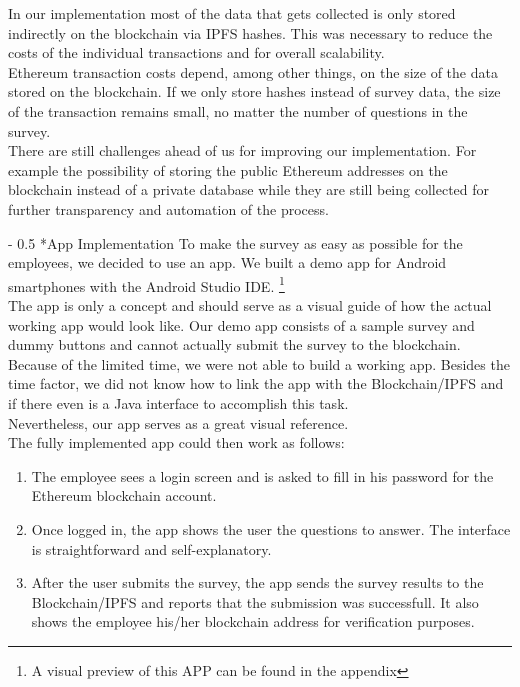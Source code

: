 \documentclass[portrait,a4paper]{article}
\makeatletter
\renewcommand\paragraph{\@startsection{paragraph}{4}{0mm}%
	{-\baselineskip}%
	{0.5\baselineskip}%
	{\normalfont\bfseries}%
}%
\makeatother
\begin{document}
			In our implementation most of the data that gets collected is only stored indirectly on the 
			blockchain via IPFS hashes. This was necessary to reduce the costs of the individual transactions 
			and for overall scalability.\\
			Ethereum transaction costs depend, among other things, on the size of the data stored on the blockchain. 
			If we only store hashes instead of survey data, the size of the transaction remains small, 
			no matter the number of questions in the survey.\\

			There are still challenges ahead of us for improving our implementation. For example the possibility of 
			storing the public Ethereum addresses on the blockchain instead of a private database while they are 
			still being collected for further transparency and automation of the process.

		\paragraph*{App Implementation}
			To make the survey as easy as possible for the employees, we decided to use an app. 
			We built a demo app for Android smartphones with the Android Studio IDE. \footnote{A visual preview
			of this APP can be found in the appendix}\\
			The app is only a concept and should serve as a visual guide of how the actual working app would look like. 
			Our demo app consists of a sample survey and dummy buttons and cannot actually submit the survey to the blockchain.\\
			Because of the limited time, we were not able to build a working app. Besides the time factor, we did not 
			know how to link the app with the Blockchain/IPFS and if there even is a Java interface to accomplish this task.\\
			Nevertheless, our app serves as a great visual reference.\\

			The fully implemented app could then work as follows:
			\begin{enumerate}
				\item	The employee sees a login screen and is asked to fill in his password for the Ethereum blockchain account.
				
				\item 	Once logged in, the app shows the user the questions to answer. 
						The interface is straightforward and self-explanatory.
						
				\item	After the user submits the survey, the app sends the survey results to the Blockchain/IPFS 
						and reports that the submission was successfull. 
						It also shows the employee his/her blockchain address for verification purposes.
			\end{enumerate}
\end{document}
